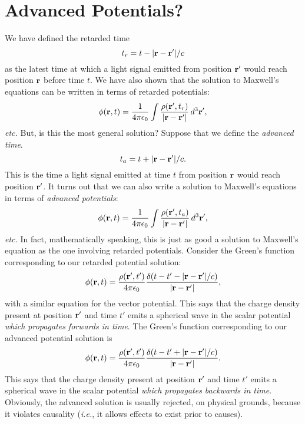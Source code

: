 \section{Advanced Potentials?}
We have defined the retarded time
\begin{equation}
t_r = t - |{\bf r} - {\bf r}'|/c
\end{equation}
as the latest time at which a light signal emitted from position ${\bf r}'$ would
reach position ${\bf r}$ before time $t$. We have also shown that the solution to Maxwell's equations
can be written in terms of retarded potentials:
\begin{equation}
\phi({\bf r}, t) = \frac{1}{4\pi\epsilon_0} \int \frac{ \rho({\bf r}', t_r)}{|{\bf r} - {\bf r}'|}\,
d^3{\bf r}',
\end{equation}
{\em etc.}
But, is this the most general solution? Suppose that we define the {\em advanced time}.
\begin{equation}
t_a = t + |{\bf r} - {\bf r}'|/c.
\end{equation}
This is the time a light signal emitted at time $t$ from position ${\bf r}$ would reach position
${\bf r}'$. It turns out that we can also write a solution to Maxwell's equations in
terms of {\em advanced potentials}:
\begin{equation}
\phi({\bf r}, t) = \frac{1}{4\pi\epsilon_0} \int \frac{ \rho({\bf r}', t_a)}{|{\bf r} - {\bf r}'|}\,
d^3{\bf r}',
\end{equation}
{\em etc.} In fact, mathematically speaking, this is just as good a solution to  Maxwell's equation as the one involving retarded
potentials. Consider the Green's function corresponding
to our retarded potential solution:
\begin{equation}\label{e4.157}
\phi({\bf r}, t) = \frac{\rho({\bf r}' ,t ')} {4\pi\epsilon_0} \frac{\delta(
t -t' - |{\bf r} - {\bf r}'|/c)}{|{\bf r} - {\bf r}'|},
\end{equation}
with a similar equation for the vector potential. This says that the charge density present
at position ${\bf r}'$ and time $t'$ emits a spherical wave in the scalar potential {\em
which propagates forwards in time}. The Green's function corresponding to our advanced potential
solution is
\begin{equation}
\phi({\bf r}, t) = \frac{\rho({\bf r}' ,t ')} {4\pi\epsilon_0} \frac{\delta(
t -t' + |{\bf r} - {\bf r}'|/c)}{|{\bf r} - {\bf r}'|}.
\end{equation}
This  says that the   charge density present
at position ${\bf r}'$ and time $t'$ emits a spherical wave in the scalar potential {\em
which propagates backwards in time}. Obviously, the advanced solution
is usually rejected, on physical grounds, because it violates causality ({\em i.e.}, it allows effects to exist prior to causes). 

